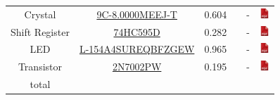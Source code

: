 \documentclass[12pt,a4paper,landscape]{article}
\begin{document}
{\begin{tabular}{|c|c|c|c|c|c|}
					Crystal &
					\href{http://fr.farnell.com/txc/9c-8-000meej-t/xtal-8-000mhz-18pf-smd-hc-49s/dp/1842347}
					{9C-8.0000MEEJ-T} & 0.604 & &
					- &
					\href{http://www.farnell.com/datasheets/1497895.pdf}{\includegraphics[height=1em]{pdf.png}}\\
					    
					Shift Register &
					\href{http://fr.farnell.com/nexperia/74hc595d/circuit-logique-74hc-cms/dp/1201269}
					{74HC595D} & 0.282 & &
					- &
					\href{http://www.farnell.com/datasheets/2038613.pdf}{\includegraphics[height=1em]{pdf.png}}\\
					    
					LED &
					\href{http://fr.farnell.com/kingbright/l-154a4sureqbfzgew/led-multicol-rgb-5mm-x-brillant/dp/2290375}
					{L-154A4SUREQBFZGEW} & 0.965 & &
					- &
					\href{http://www.farnell.com/datasheets/2046653.pdf}{\includegraphics[height=1em]{pdf.png}}\\
					    
					Transistor &
					\href{http://fr.farnell.com/nexperia/2n7002pw/mosfet-canal-n-60v-0-3a-sot323/dp/1829184}
					{2N7002PW} & 0.195 & &
					- &
					\href{http://www.farnell.com/datasheets/1760698.pdf}{\includegraphics[height=1em]{pdf.png}}\\
					    
					\hline
					total & & & & &\\
					\hline
				\end{tabular}
			}
\end{document}
